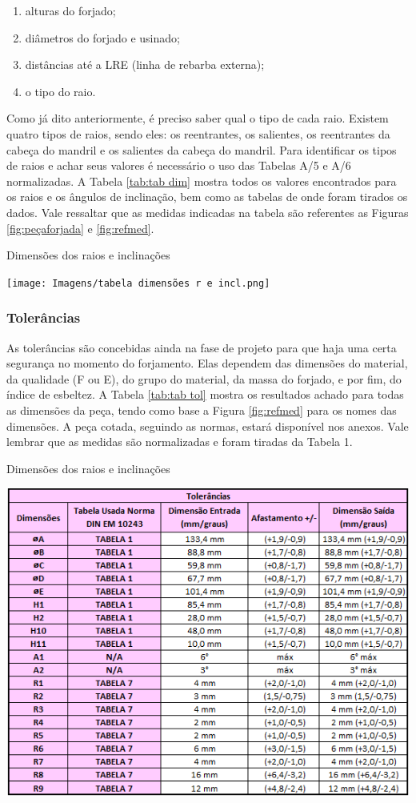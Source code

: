 \documentclass[deposito, acronym, symbols]{fei}
\begin{document}
\begin{enumerate}
    \item alturas do forjado;
    \item diâmetros do forjado e usinado;
    \item distâncias até a LRE (linha de rebarba externa);
    \item o tipo do raio.
\end{enumerate}

 
Como já dito anteriormente, é preciso saber qual o tipo de cada raio. Existem quatro tipos de raios, sendo eles: os reentrantes, os salientes, os reentrantes da cabeça do mandril e os salientes da cabeça do mandril. Para identificar os tipos de raios e achar seus valores é necessário o uso das Tabelas A/5 e A/6 normalizadas. A Tabela \ref{tab:tab dim} mostra todos os valores encontrados para os raios e os ângulos de inclinação, bem como as tabelas de onde foram tirados os dados. Vale ressaltar que as medidas indicadas na tabela são referentes as Figuras \ref{fig:peçaforjada} e \ref{fig:refmed}.

\begin{table}[!htb]
 \centering
    \caption{Dimensões dos raios e inclinações}
    \texttt{[image: Imagens/tabela dimensões r e incl.png]}
    \label{tab:tab dim}
 \end{table}

 \subsubsection{Tolerâncias}

As tolerâncias são concebidas ainda na fase de projeto para que haja uma certa segurança no momento do forjamento. Elas dependem das dimensões do material, da qualidade (F ou E), do grupo do material, da massa do forjado, e por fim, do índice de esbeltez. A Tabela \ref{tab:tab tol} mostra os resultados achado para todas as dimensões da peça, tendo como base a Figura \ref{fig:refmed} para os nomes das dimensões. A peça cotada, seguindo as normas, estará disponível nos anexos. Vale lembrar que as medidas são normalizadas e foram tiradas da Tabela 1.


\begin{table}[!htb]
 \centering
    \caption{Dimensões dos raios e inclinações}
    \includegraphics[width=0.8\linewidth]{Imagens/tolerancias1.png}
    \label{tab:tab tol}
 \end{table}
 
\end{document}
